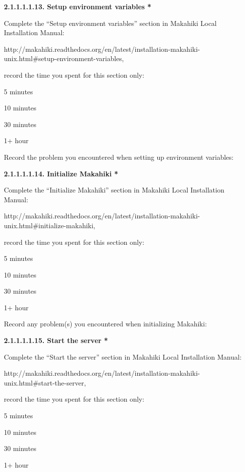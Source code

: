 {\bf 2.1.1.1.1.13. Setup environment variables *}

Complete the ``Setup environment variables'' section in Makahiki Local Installation Manual:

http://makahiki.readthedocs.org/en/latest/installation-makahiki-unix.html\#setup-environment-variables, 

record the time you spent for this section only:

\begin{radiobutton}
\item 5 minutes
\item  10 minutes
\item  30 minutes
\item  1+ hour
\end{radiobutton}

Record the problem you encountered when setting up environment variables: \underline{\hspace{3cm}}

{\bf 2.1.1.1.1.14. Initialize Makahiki *}

Complete the ``Initialize Makahiki'' section in Makahiki Local Installation Manual:

http://makahiki.readthedocs.org/en/latest/installation-makahiki-unix.html\#initialize-makahiki, 

record the time you spent for this section only:

\begin{radiobutton}
\item 5 minutes
\item  10 minutes
\item  30 minutes
\item  1+ hour
\end{radiobutton}

Record any problem(s) you encountered when initializing Makahiki: \underline{\hspace{4cm}}

{\bf 2.1.1.1.1.15. Start the server *}

Complete the ``Start the server'' section in Makahiki Local Installation Manual:

http://makahiki.readthedocs.org/en/latest/installation-makahiki-unix.html\#start-the-server, 

record the time you spent for this section only:

\begin{radiobutton}
\item 5 minutes
\item  10 minutes
\item  30 minutes
\item  1+ hour
\end{radiobutton}

